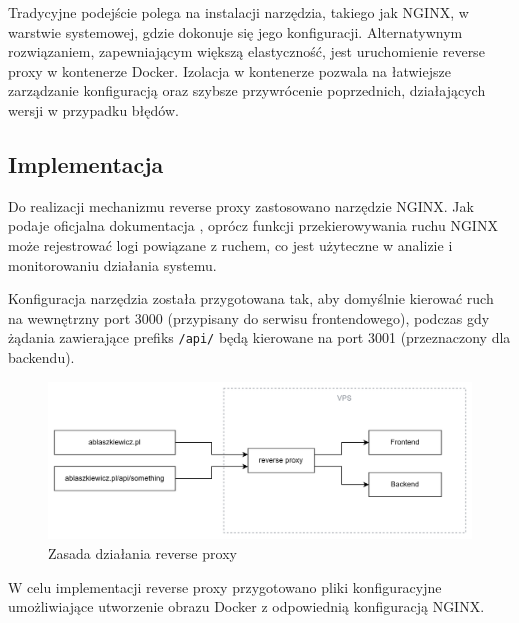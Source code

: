 \documentclass{article}
\begin{document}
Tradycyjne podejście polega na instalacji narzędzia, takiego jak NGINX, w warstwie systemowej, gdzie dokonuje się jego konfiguracji. Alternatywnym rozwiązaniem, zapewniającym większą elastyczność, jest uruchomienie reverse proxy w kontenerze Docker. Izolacja w kontenerze pozwala na łatwiejsze zarządzanie konfiguracją oraz szybsze przywrócenie poprzednich, działających wersji w przypadku błędów.

\subsection{Implementacja}

Do realizacji mechanizmu reverse proxy zastosowano narzędzie NGINX. Jak podaje oficjalna dokumentacja \cite{NginxDocs}, oprócz funkcji przekierowywania ruchu NGINX może rejestrować logi powiązane z ruchem, co jest użyteczne w analizie i monitorowaniu działania systemu.

Konfiguracja narzędzia została przygotowana tak, aby domyślnie kierować ruch na wewnętrzny port 3000 (przypisany do serwisu frontendowego), podczas gdy żądania zawierające prefiks \lstinline|/api/| będą kierowane na port 3001 (przeznaczony dla backendu).

\begin{figure}[H]
    \centering
    \includegraphics[width=1\linewidth]{reverseProxyDiagram.png}
    \caption{Zasada działania reverse proxy}
    \label{fig:enter-label}
\end{figure}

W celu implementacji reverse proxy przygotowano pliki konfiguracyjne umożliwiające utworzenie obrazu Docker z odpowiednią konfiguracją NGINX.
\end{document}
